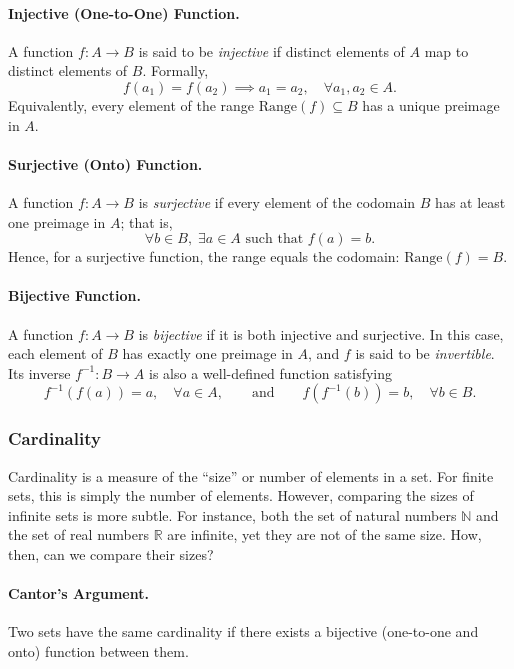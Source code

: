 \paragraph{Injective (One-to-One) Function.}
A function \( f: A \to B \) is said to be \emph{injective} if distinct elements of \( A \) map to distinct elements of \( B \). Formally,
\[
f(a_1) = f(a_2) \implies a_1 = a_2, \quad \forall a_1, a_2 \in A.
\]
Equivalently, every element of the range \( \mathrm{Range}(f) \subseteq B \) has a unique preimage in \( A \).

\paragraph{Surjective (Onto) Function.}
A function \( f: A \to B \) is \emph{surjective} if every element of the codomain \( B \) has at least one preimage in \( A \); that is,
\[
\forall b \in B, \; \exists a \in A \text{ such that } f(a) = b.
\]
Hence, for a surjective function, the range equals the codomain: \( \mathrm{Range}(f) = B \).

\paragraph{Bijective Function.}
A function \( f: A \to B \) is \emph{bijective} if it is both injective and surjective.  
In this case, each element of \( B \) has exactly one preimage in \( A \), and \( f \) is said to be \emph{invertible}.  
Its inverse \( f^{-1}: B \to A \) is also a well-defined function satisfying
\[
f^{-1}(f(a)) = a, \quad \forall a \in A, \qquad \text{and} \qquad f(f^{-1}(b)) = b, \quad \forall b \in B.
\]


\subsubsection{Cardinality}

Cardinality is a measure of the ``size'' or number of elements in a set. For finite sets, this is simply the number of elements. However, comparing the sizes of infinite sets is more subtle. For instance, both the set of natural numbers $\mathbb{N}$ and the set of real numbers $\mathbb{R}$ are infinite, yet they are not of the same size. How, then, can we compare their sizes?

\paragraph{Cantor's Argument.}
Two sets have the same cardinality if there exists a bijective (one-to-one and onto) function between them.

